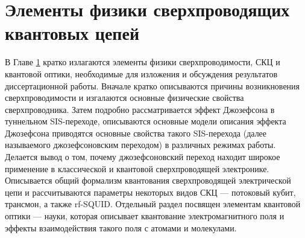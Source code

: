 \chapter{Элементы физики сверхпроводящих квантовых цепей} \label{c1}

В Главе \ref{c1} кратко излагаются элементы физики сверхпроводимости, СКЦ и квантовой оптики, необходимые для изложения и обсуждения результатов диссертационной работы. Вначале кратко описываются причины возникновения сверхпроводимости и изгалаются основные физические свойства сверхпроводника. Затем подробно рассматривается эффект Джозефсона в туннельном SIS-переходе, описываются основные модели описания эффекта Джозефсона приводятся основные свойства такого SIS-перехода (далее называемого джозефсоновским переходом) в различных режимах работы. Делается вывод о том, почему джозефсоновский переход находит широкое применение в классической и квантовой сверхпроводящей электронике. Описывается общий формализм квантования сверхпроводящей электрической цепи и рассчитываются параметры некоторых видов СКЦ --- потоковый кубит, трансмон, а также rf-SQUID. 
Отдельный раздел посвящен элементам квантовой оптики --- науки, которая описывает квантование электромагнитного поля и эффекты взаимодействия такого поля с атомами и молекулами. 
